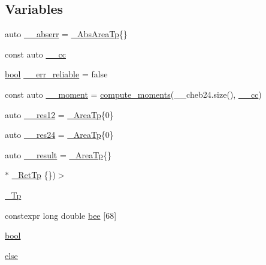 \subsection*{Variables}
\begin{DoxyCompactItemize}
\item 
auto \hyperlink{namespace____gnu__cxx_a72f736cff127f1574e91a301de9e074b}{\+\_\+\+\_\+abserr} = \hyperlink{namespace____gnu__cxx_a2f005089fd7e29a63d4165c56a5f4235}{\+\_\+\+Abs\+Area\+Tp}\{\}
\item 
const auto \hyperlink{namespace____gnu__cxx_a7994ff975ddada084e4a738578302940}{\+\_\+\+\_\+cc}
\item 
\hyperlink{namespace____gnu__cxx_ae83aca57f97767d5d09188718728a0ac}{bool} \hyperlink{namespace____gnu__cxx_a989f5db5dc6da4eeca54cd1f93ec82ee}{\+\_\+\+\_\+err\+\_\+reliable} = false
\item 
const auto \hyperlink{namespace____gnu__cxx_aa353478f1f8d25130d4fc48bf804a24c}{\+\_\+\+\_\+moment} = \hyperlink{namespace____gnu__cxx_a698ae16aa1c82aa755f3703cc20e2b8e}{compute\+\_\+moments}(\+\_\+\+\_\+cheb24.\+size(), \hyperlink{namespace____gnu__cxx_a7994ff975ddada084e4a738578302940}{\+\_\+\+\_\+cc})
\item 
auto \hyperlink{namespace____gnu__cxx_a6ea2384a750bf3ec4778454ae3b4b5c3}{\+\_\+\+\_\+res12} = \hyperlink{namespace____gnu__cxx_ae97a51b75e19c30f48d27fac4664de6e}{\+\_\+\+Area\+Tp}\{0\}
\item 
auto \hyperlink{namespace____gnu__cxx_af9fb40bd2c7cde535117200af946d670}{\+\_\+\+\_\+res24} = \hyperlink{namespace____gnu__cxx_ae97a51b75e19c30f48d27fac4664de6e}{\+\_\+\+Area\+Tp}\{0\}
\item 
auto \hyperlink{namespace____gnu__cxx_a500ea9f53aeaecd8c2ae657503450578}{\+\_\+\+\_\+result} = \hyperlink{namespace____gnu__cxx_ae97a51b75e19c30f48d27fac4664de6e}{\+\_\+\+Area\+Tp}\{\}
\item 
$\ast$ \hyperlink{namespace____gnu__cxx_a886e03ece3d53ff7fa6c098a40f93fa5}{\+\_\+\+Ret\+Tp} \{\})$>$
\item 
\hyperlink{namespace____gnu__cxx_a3b19a9c800ca194374ef9172290f7d79}{\+\_\+\+Tp}
\item 
constexpr long double \hyperlink{namespace____gnu__cxx_aad4f17907300687377704d1e628e1d70}{bee} \mbox{[}68\mbox{]}
\item 
\hyperlink{namespace____gnu__cxx_ae83aca57f97767d5d09188718728a0ac}{bool}
\item 
\hyperlink{namespace____gnu__cxx_ad845303a33fef33286c11510aea1d5cc}{else}
\item 

\end{DoxyCompactItemize}
